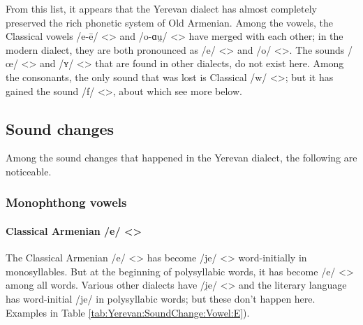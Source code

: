From this list, it appears that the Yerevan dialect has almost completely preserved the rich phonetic system of Old Armenian. Among the vowels, the Classical vowels /e-ē/ <> and /o-ɑu̯/ <> have merged with each other; in the modern dialect, they are both pronounced as /e/ <> and /o/ <>. The sounds /œ/ <> and /ʏ/ <> that are found in other dialects, do not exist here. Among the consonants, the only sound that was lost is Classical /w/ <>; but it has gained the sound /f/ <>, about which see more below.

\subsection{Sound changes}





Among the sound changes that happened in the Yerevan dialect, the following are noticeable. 


\subsubsection{Monophthong vowels}
\paragraph{Classical Armenian /e/ <>}

The Classical Armenian /e/ <> has become /je/ <> word-initially in monosyllables. But at the beginning of polysyllabic words, it has become /e/ <> among all words. Various other dialects have /i̯e/ <> and the literary language has word-initial /je/ in polysyllabic words; but these don't happen here. Examples in Table \ref{tab:Yerevan:SoundChange:Vowel:E}). 

